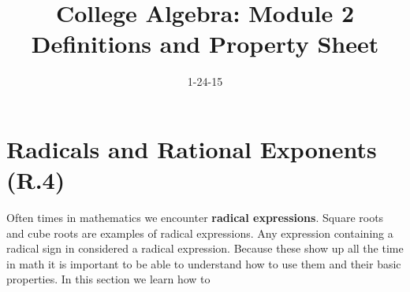 \documentclass[12pt]{article}
\begin{document}
\title{College Algebra: Module 2 Definitions and Property Sheet}
\date{1-24-15}
\author{}
\maketitle


\section{Radicals and Rational Exponents (R.4)}

Often times in mathematics we encounter \textbf{radical expressions}. Square roots and cube roots are examples of radical expressions. Any expression containing a radical sign in considered a radical expression. Because these show up all the time in math it is important to be able to understand how to use them and their basic properties. In this section we learn how to 
\end{document}

